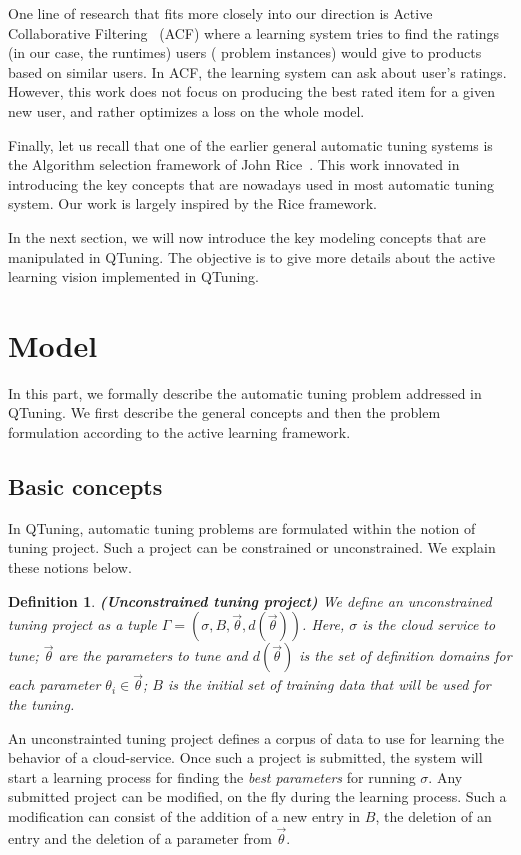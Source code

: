 \documentclass[10pt, conference, compsocconf]{IEEEtran}
\newtheorem{definition}[theorem]{Definition}
\begin{document}
One line of research that fits more closely into our direction is Active
Collaborative Filtering~\cite{DBLP:journals/corr/abs-1212-2442} (ACF) where a
learning system tries to find the ratings (in our case, the runtimes) users (
problem instances) would give to products based on similar users. In ACF,
the learning system can ask about user's ratings. However, this work
does not focus on producing the best rated item for a given new user, and rather
optimizes a loss on the whole model.

Finally, let us recall that one of the earlier general automatic tuning systems
is the  Algorithm selection framework of John Rice~\cite{Rice}. This work
innovated in introducing the key concepts that are nowadays used in most
automatic tuning system. Our work is largely inspired by the Rice framework.

In the next section, we will now introduce the key modeling concepts that are
manipulated in QTuning. The objective is to give more details about the active
learning vision implemented in QTuning.

\section{Model} \label{Model}

In this part, we formally describe the automatic tuning problem addressed in QTuning. We first describe
the general concepts and then the problem formulation according to the active learning framework.
 \subsection{Basic concepts}

In QTuning, automatic tuning problems are formulated within the notion of tuning project.  Such
a project can be  constrained or unconstrained. We explain these notions below.

\begin{definition}{\bf (Unconstrained tuning project)}
We define an unconstrained tuning project as a tuple $ \Gamma = (\sigma, B, \vec{\theta}, d(\vec{\theta}))$. Here, $\sigma$ is the cloud service to tune;
$\vec{\theta}$ are the parameters to tune and $d(\vec{\theta})$ is the set of definition domains for each parameter
$\theta_i \in \vec{\theta}$; $B$ is the initial set of training data that will be used for the tuning.
\end{definition}

An unconstrainted tuning project defines a corpus of data to use for learning the behavior of a cloud-service.
Once such a project is submitted, the system will start a learning process for finding the {\it best parameters} for
running $\sigma$. Any submitted project can be modified, on the fly during the learning process. Such a modification can consist of
the addition of a new entry in $B$, the deletion of an entry and the deletion of a parameter from $\vec{\theta}$.
\end{document}
